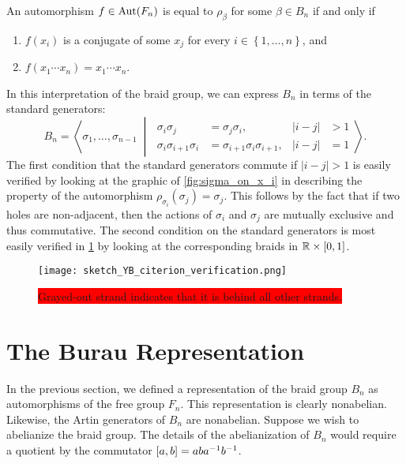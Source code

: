 \begin{theorem}
    An automorphism $f\in\textrm{Aut}\!\left( F_n \right)$ is equal to $\rho_\beta$ for some $\beta\in B_n$ if and only if
    \begin{enumerate}
        \item $f(x_i)$ is a conjugate of some $x_j$ for every $i\in\left\{ 1,\dots,n \right\}$, and
        \item $f(x_1\cdots x_n) = x_1\cdots x_n$.
    \end{enumerate}
\end{theorem}

In this interpretation of the braid group, we can express $B_n$ in terms of the standard generators:
\begin{equation}
    B_n = \left\langle \sigma_1,\dots,\sigma_{n-1} \;\middle|\;
    \begin{aligned}
        \sigma_i\sigma_j &= \sigma_j\sigma_i, & |i-j|&>1 \\
        \sigma_i\sigma_{i+1}\sigma_i &= \sigma_{i+1}\sigma_i\sigma_{i+1}, & |i-j|&=1
    \end{aligned}
    \right\rangle.
\end{equation}
The first condition that the standard generators commute if $|i-j|>1$ is easily verified by looking at the graphic of \cref{fig:sigma_on_x_i} in describing the property of the automorphism $\rho_{\sigma_i}(\sigma_j) = \sigma_j$. This follows by the fact that if two holes are non-adjacent, then the actions of $\sigma_i$ and $\sigma_j$ are mutually exclusive and thus commutative. The second condition on the standard generators is most easily verified in \cref{fig:YB_criterion_verification} by looking at the corresponding braids in $\mathbb{R}\times[0,1]$.
\begin{figure}[htbp]
    \centering
    \texttt{[image: sketch\_YB\_citerion\_verification.png]}
    \caption{\colorbox{red}{Grayed-out strand indicates that it is behind all other strands.}}\label{fig:YB_criterion_verification}
\end{figure}

\section{The Burau Representation}
In the previous section, we defined a representation of the braid group $B_n$ as automorphisms of the free group $F_n$. This representation is clearly nonabelian. Likewise, the Artin generators of $B_n$ are nonabelian. Suppose we wish to abelianize the braid group. The details of the abelianization of $B_n$ would require a quotient by the commutator $\left[ a,b \right]=ab{ a }^{-1}{ b }^{-1}$.

